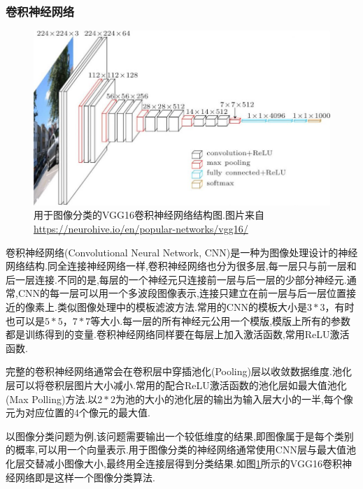 \subsubsection{卷积神经网络}
\par
\begin{figure}[htbp!]
    \centering
    \includegraphics[width = 1.\textwidth]{chap/img/vgg16-neural-network.jpg}
    \caption{
        用于图像分类的VGG16\supercite{simonyan2014very}卷积神经网络结构图.图片来自 \url{https://neurohive.io/en/popular-networks/vgg16/}
        }\label{fig:vgg16_architecture}
\end{figure}
\par
卷积神经网络(Convolutional Neural Network, CNN)是一种为图像处理设计的神经网络结构.同全连接神经网络一样,卷积神经网络也分为很多层,每一层只与前一层和后一层连接.不同的是,每层的一个神经元只连接前一层与后一层的少部分神经元.通常,CNN的每一层可以用一个多波段图像表示,连接只建立在前一层与后一层位置接近的像素上.类似图像处理中的模板滤波方法.常用的CNN的模板大小是$3*3$，有时也可以是$5*5$，$7*7$等大小.每一层的所有神经元公用一个模版,模版上所有的参数都是训练得到的变量.卷积神经网络同样要在每层上加入激活函数,常用ReLU激活函数.
\par
完整的卷积神经网络通常会在卷积层中穿插池化(Pooling)层以收敛数据维度.池化层可以将卷积层图片大小减小.常用的配合ReLU激活函数的池化层如最大值池化(Max Polling)方法.以$2*2$为池的大小的池化层的输出为输入层大小的一半,每个像元为对应位置的4个像元的最大值.
\par
以图像分类问题为例,该问题需要输出一个较低维度的结果,即图像属于是每个类别的概率,可以用一个向量表示.用于图像分类的神经网络通常使用CNN层与最大值池化层交替减小图像大小,最终用全连接层得到分类结果.如图\ref{fig:vgg16_architecture}所示的VGG16\supercite{simonyan2014very}卷积神经网络即是这样一个图像分类算法.
\par
